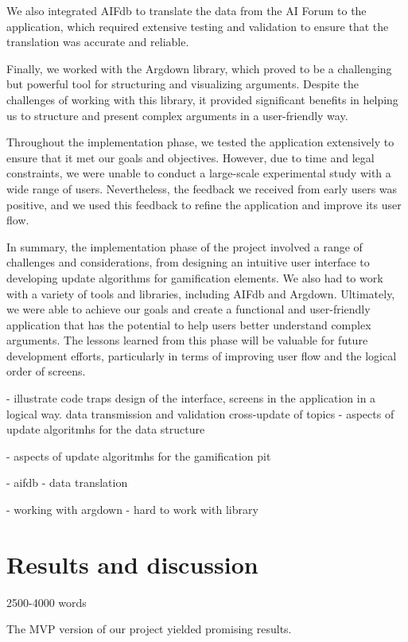 \documentclass{article}
\begin{document}
We also integrated AIFdb to translate the data from the AI Forum to the application, which required extensive testing and validation to ensure that the translation was accurate and reliable.

Finally, we worked with the Argdown library, which proved to be a challenging but powerful tool for structuring and visualizing arguments. Despite the challenges of working with this library, it provided significant benefits in helping us to structure and present complex arguments in a user-friendly way.

Throughout the implementation phase, we tested the application extensively to ensure that it met our goals and objectives. However, due to time and legal constraints, we were unable to conduct a large-scale experimental study with a wide range of users. Nevertheless, the feedback we received from early users was positive, and we used this feedback to refine the application and improve its user flow.

In summary, the implementation phase of the project involved a range of challenges and considerations, from designing an intuitive user interface to developing update algorithms for gamification elements. We also had to work with a variety of tools and libraries, including AIFdb and Argdown. Ultimately, we were able to achieve our goals and create a functional and user-friendly application that has the potential to help users better understand complex arguments. The lessons learned from this phase will be valuable for future development efforts, particularly in terms of improving user flow and the logical order of screens.


- illustrate code traps
design of the interface, screens in the application in a logical way. 
data transmission and validation cross-update of topics
- aspects of update algoritmhs for the data structure

- aspects of update algoritmhs for the gamification pit

- aifdb - data translation

- working with argdown - hard to work with library

\blindtext
\newpage

\section{Results and discussion} 2500-4000 words

The MVP version of our project yielded promising results. 
\end{document}
